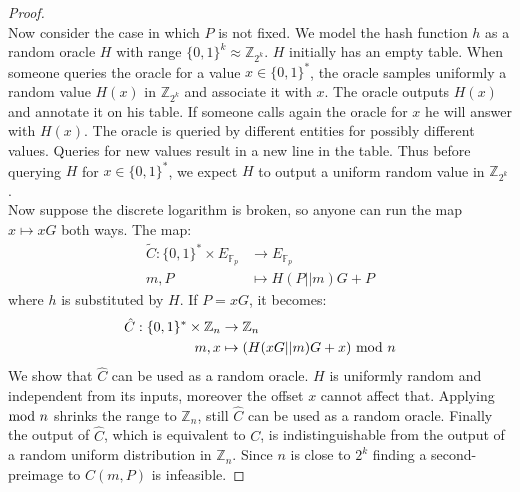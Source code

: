 \begin{proof}
	\\
	Now consider the case in which $P$ is not fixed.
	We model the hash function $h$ as a random oracle $H$ with range $\{0,1\}^k\approx \mathbb{Z}_{2^k}$.
	$H$ initially has an empty table. 
	When someone queries the oracle for a value $x \in \{0,1\}^*$,
	the oracle samples uniformly a random value $H(x)$ in $\mathbb{Z}_{2^k}$ and associate it with $x$.
	The oracle outputs $H(x)$ and annotate it on his table.
	If someone calls again the oracle for $x$ he will answer with $H(x)$.
	The oracle is queried by different entities for possibly different values.
	Queries for new values result in a new line in the table.
	Thus before querying $H$ for $x \in \{0,1\}^*$, we expect $H$ to output a uniform random value in $\mathbb{Z}_{2^k}$.
	\\
	Now suppose the  discrete logarithm is broken, so anyone can run the map $x \mapsto xG$ both ways.
	The map:
	\begin{equation*}
	\begin{split}
	\tilde{C} : \{0,1\}^* \times E_{\mathbb{F}_p}  & \rightarrow E_{\mathbb{F}_p} \\
	m, P & \mapsto H(P||m)G + P
	\end{split}
	\end{equation*}
	where $h$ is substituted by $H$. 
	If $P=xG$, it becomes:
	\begin{equation*}
	\begin{split}
	\hat{C} : \{0,1\}^* \times \mathbb{Z}_n  & \rightarrow \mathbb{Z}_n \\
	m, x & \mapsto (H(xG||m)G + x)\textmd{ mod }n
	\end{split}
	\end{equation*}
	We show that $\hat{C}$ can be used as a random oracle.
	$H$ is uniformly random and independent from its inputs, 
	moreover the offset $x$ cannot affect that.
	Applying $\textmd{mod }n$ shrinks the range to $\mathbb{Z}_n$,
	still $\hat{C}$ can be used as a random oracle.
	Finally the output of $\hat{C}$, which is equivalent to $C$, is indistinguishable from the output of a random uniform distribution in $\mathbb{Z}_n$.
	Since $n$ is close to $2^k$ finding a second-preimage to $C(m,P)$ is infeasible. 
\end{proof}

